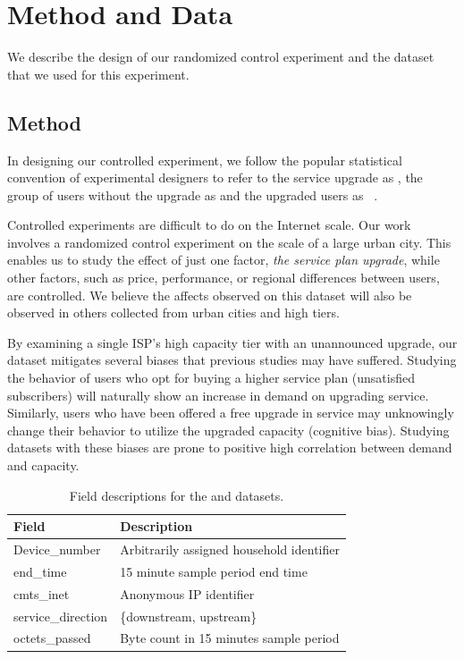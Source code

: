 \section{Method and Data}\label{sec:data}

We describe the design of our randomized control experiment and the
dataset that we used for this experiment.

\subsection{Method}

In designing our controlled experiment, we follow the popular
statistical convention of experimental designers to refer to the service
upgrade as \factor{}, the group of users without the upgrade as
\control{} and the upgraded users as \treatment{}~\cite{stats-design}.

Controlled experiments are difficult to do on the Internet scale.  Our
work involves a randomized control experiment on the scale of a large
urban city. This enables us to study the effect of just one factor,
\emph{the service plan upgrade}, while other factors, such as price,
performance, or regional differences between users, are controlled. We
believe the affects observed on this dataset will also be observed in
others collected from urban cities and high tiers.

By examining a single ISP's high capacity tier with an unannounced upgrade,
our dataset mitigates several biases that previous studies may have 
suffered. Studying the behavior of users who opt for buying a higher service plan
(unsatisfied subscribers) will naturally show an increase in demand on
upgrading service. Similarly, users who have been offered a free upgrade in service
may unknowingly change their behavior to utilize the upgraded capacity
(cognitive bias). Studying datasets with these biases are prone 
to positive high correlation between demand and capacity. 

\begin{table}[t]
\small
\begin{tabular}{ l l }
\hline
\textbf{Field}         & \textbf{Description}				\\\hline
Device\_number         & Arbitrarily assigned household identifier	\\
end\_time              & 15 minute sample period end time		\\
cmts\_inet             & Anonymous IP identifier			\\
service\_direction     & \{downstream, upstream\}                 	\\
octets\_passed         & Byte count in 15 minutes sample period		\\\hline
\end{tabular}
\caption{Field descriptions for the \control{} and \treatment{} datasets.}
\label{tab:field-description}
\end{table}

